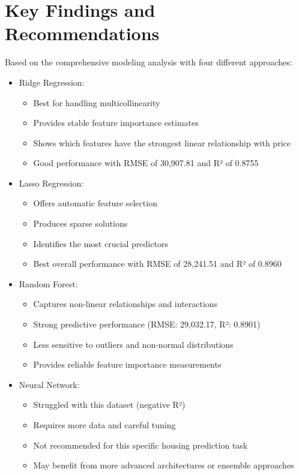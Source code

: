 \section{Key Findings and Recommendations}
Based on the comprehensive modeling analysis with four different approaches:
\begin{itemize}
    \item Ridge Regression:
    \begin{itemize}
        \item Best for handling multicollinearity
        \item Provides stable feature importance estimates
        \item Shows which features have the strongest linear relationship with price
        \item Good performance with RMSE of 30,907.81 and R² of 0.8755
    \end{itemize}
    \item Lasso Regression:
    \begin{itemize}
        \item Offers automatic feature selection
        \item Produces sparse solutions
        \item Identifies the most crucial predictors
        \item Best overall performance with RMSE of 28,241.51 and R² of 0.8960
    \end{itemize}
    \item Random Forest:
    \begin{itemize}
        \item Captures non-linear relationships and interactions
        \item Strong predictive performance (RMSE: 29,032.17, R²: 0.8901)
        \item Less sensitive to outliers and non-normal distributions
        \item Provides reliable feature importance measurements
    \end{itemize}
    \item Neural Network:
    \begin{itemize}
        \item Struggled with this dataset (negative R²)
        \item Requires more data and careful tuning
        \item Not recommended for this specific housing prediction task
        \item May benefit from more advanced architectures or ensemble approaches
    \end{itemize}
\end{itemize}

